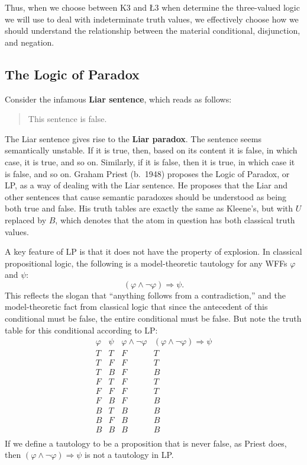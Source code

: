 \documentclass[11pt]{article}
\theoremstyle{definition}
\theoremstyle{remark}
\begin{document}
\noindent
Thus, when we choose between K3 and Ł3 when determine the three-valued logic we will use to deal with indeterminate truth values, we effectively choose how we should understand the relationship between the material conditional, disjunction, and negation.\par 


\subsection{The Logic of Paradox}
Consider the infamous \textbf{Liar sentence}, which reads as follows:
\begin{quote}
    This sentence is false.
\end{quote}
The Liar sentence gives rise to the \textbf{Liar paradox}. The sentence seems semantically unstable. If it is true, then, based on its content it is false, in which case, it is true, and so on. Similarly, if it is false, then it is true, in which case it is false, and so on. Graham Priest (b.\ 1948) proposes the Logic of Paradox, or LP, as a way of dealing with the Liar sentence. He proposes that the Liar and other sentences that cause semantic paradoxes should be understood as being both true and false. His truth tables are exactly the same as Kleene's, but with $U$ replaced by $B$, which denotes that the atom in question has both classical truth values.\par 

A key feature of LP is that it does not have the property of explosion. In classical propositional logic, the following is a model-theoretic tautology for any WFFs $\varphi$ and $\psi$: $$(\varphi\wedge\neg\varphi)\Rightarrow\psi.$$
This reflects the slogan that ``anything follows from a contradiction,'' and the model-theoretic fact from classical logic that since the antecedent of this conditional must be false, the entire conditional must be false. But note the truth table for this conditional according to LP:
\noindent
\[
\begin{array}{c|c|c|c}
\varphi & \psi & \varphi \wedge \neg \varphi & (\varphi \wedge \neg \varphi) \Rightarrow \psi \\
\hline
T & T & F & T \\
T & F & F & T \\
T & B & F & B \\
F & T & F & T \\
F & F & F & T \\
F & B & F & B \\
B & T & B & B \\
B & F & B & B \\
B & B & B & B \\
\end{array}
\]
If we define a tautology to be a proposition that is never false, as Priest does, then $(\varphi\wedge\neg\varphi)\Rightarrow\psi$ is not a tautology in LP.\par 
\end{document}
